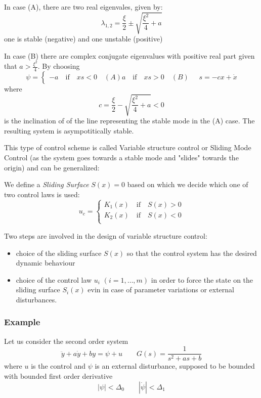 \documentclass{book}
\begin{document}
In case (A), there are two real eigenvales, given by:
\[
    \lambda_{1,2} = \displaystyle\frac{\xi}{2}\pm \sqrt{\displaystyle\frac{\xi^2}{4}+a}
\]
one is stable (negative) and one unstable (positive)

In case (B) there are complex conjugate eigenvalues with positive real part given that $a>\frac{\xi^2}{4}$. 
By choosing
\[
    \psi = \begin{cases}
        -a \quad \text{if} \quad xs<0 \quad (A)
        a \quad \text{if} \quad xs>0 \quad (B)
    \end{cases} \quad s = -cx +\dot{x}
\]
where
\[
    c=\frac{\xi}{2}-\sqrt{\frac{\xi^2}{4}+a}<0
\]
is the inclination of of the line representing the stable mode in the (A) case. The resulting system is asympotitically stable.

This type of control scheme is called Variable structure control or Sliding Mode Control (as the system goes towards a stable mode and "slides" towards the origin) and can be generalized:

We define a \emph{Sliding Surface} $S(x)=0$ based on which we decide which one of two control laws is used:
\[
    u_c = \begin{cases}
        K_1(x) \quad \text{if} \quad S(x)>0\\
        K_2(x) \quad \text{if} \quad S(x)<0\\
    \end{cases}
\]

Two steps are involved in the design of variable structure control:
\begin{itemize}
    \item choice of the sliding surface $S(x)$ so that the control system has the desired dynamic behaviour 
    \item choice of the control law $u_i$ $(i=1,\dots,m)$ in order to force the state on the sliding surface $S_i(x)$ evin in case of parameter variations or external disturbances. 
\end{itemize}
\subsubsection{Example}
Let us consider the second order system
\[
    \ddot{y} + a\dot{y} + by = \psi +u \qquad G(s) = \displaystyle\frac{1}{s^2+as+b}
\]
where $u$ is the control and $\psi$ is an external disturbance, supposed to be bounded with bounded first order derivative
\[
    |\psi|<\Delta_0 \qquad |\dot{\psi}|<\Delta_1
\]
\end{document}
